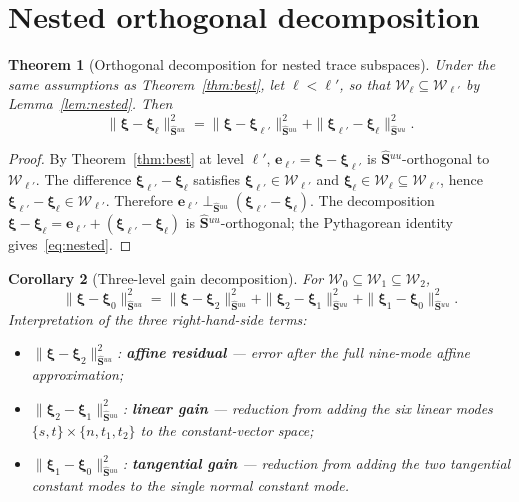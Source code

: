 \documentclass[11pt,a4paper]{article}
\newtheorem{theorem}{Theorem}[section]
\newtheorem{corollary}[theorem]{Corollary}
\theoremstyle{definition}
\newcommand{\Schur}{\mathbf{S}}
\newcommand{\Shatuu}{\widehat{\Schur}{}^{uu}}
\newcommand{\Wspace}{\mathcal{W}}
\begin{document}
\section{Nested orthogonal decomposition}

\begin{theorem}[Orthogonal decomposition for nested trace subspaces]\label{thm:nested}
  Under the same assumptions as Theorem~\ref{thm:best}, let
  $\ell < \ell'$, so that $\Wspace_\ell \subseteq \Wspace_{\ell'}$ by
  Lemma~\ref{lem:nested}.  Then
  \begin{equation}\label{eq:nested}
    \|\bm{\xi} - \bm{\xi}_\ell\|_{\Shatuu}^2
    = \|\bm{\xi} - \bm{\xi}_{\ell'}\|_{\Shatuu}^2
      + \|\bm{\xi}_{\ell'} - \bm{\xi}_\ell\|_{\Shatuu}^2.
  \end{equation}
\end{theorem}

\begin{proof}
  By Theorem~\ref{thm:best} at level $\ell'$,
  $\bm{e}_{\ell'} = \bm{\xi} - \bm{\xi}_{\ell'}$ is
  $\Shatuu$-orthogonal to $\Wspace_{\ell'}$.
  The difference $\bm{\xi}_{\ell'} - \bm{\xi}_\ell$ satisfies
  $\bm{\xi}_{\ell'} \in \Wspace_{\ell'}$ and
  $\bm{\xi}_\ell \in \Wspace_\ell \subseteq \Wspace_{\ell'}$,
  hence $\bm{\xi}_{\ell'} - \bm{\xi}_\ell \in \Wspace_{\ell'}$.
  Therefore $\bm{e}_{\ell'} \perp_{\Shatuu}
  (\bm{\xi}_{\ell'} - \bm{\xi}_\ell)$.
  The decomposition
  $\bm{\xi} - \bm{\xi}_\ell = \bm{e}_{\ell'} +
   (\bm{\xi}_{\ell'} - \bm{\xi}_\ell)$
  is $\Shatuu$-orthogonal; the Pythagorean identity gives~\eqref{eq:nested}.
\end{proof}

\begin{corollary}[Three-level gain decomposition]\label{cor:gains}
  For $\Wspace_0 \subseteq \Wspace_1 \subseteq \Wspace_2$,
  \begin{equation}\label{eq:gains}
    \|\bm{\xi} - \bm{\xi}_0\|_{\Shatuu}^2
    = \|\bm{\xi} - \bm{\xi}_2\|_{\Shatuu}^2
      + \|\bm{\xi}_2 - \bm{\xi}_1\|_{\Shatuu}^2
      + \|\bm{\xi}_1 - \bm{\xi}_0\|_{\Shatuu}^2.
  \end{equation}
  Interpretation of the three right-hand-side terms:
  \begin{itemize}
    \item $\|\bm{\xi} - \bm{\xi}_2\|_{\Shatuu}^2$:
      \textbf{affine residual} --- error after the full nine-mode
      affine approximation;
    \item $\|\bm{\xi}_2 - \bm{\xi}_1\|_{\Shatuu}^2$:
      \textbf{linear gain} --- reduction from adding the six linear
      modes $\{s,t\}\times\{n,t_1,t_2\}$ to the constant-vector space;
    \item $\|\bm{\xi}_1 - \bm{\xi}_0\|_{\Shatuu}^2$:
      \textbf{tangential gain} --- reduction from adding the two
      tangential constant modes to the single normal constant mode.
  \end{itemize}
\end{corollary}
\end{document}
